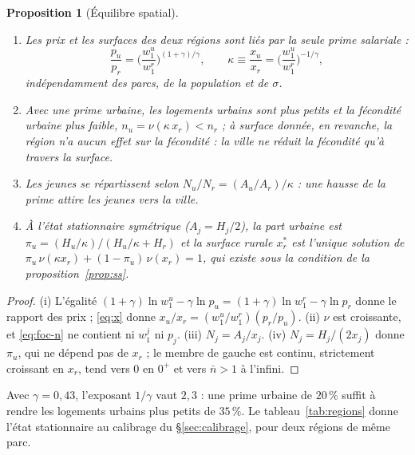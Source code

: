 \documentclass[11pt,a4paper]{article}
\theoremstyle{plain}
\newtheorem{proposition}{Proposition}
\theoremstyle{definition}
\begin{document}
\begin{proposition}[Équilibre spatial]\label{prop:regions}
\begin{enumerate}
\item[(i)] Les prix et les surfaces des deux régions sont liés par la seule prime salariale :
\[
\frac{p_u}{p_r} = \Big(\frac{w_1^u}{w_1^r}\Big)^{(1+\gamma)/\gamma} ,
\qquad
\kappa \equiv \frac{x_u}{x_r} = \Big(\frac{w_1^u}{w_1^r}\Big)^{-1/\gamma} ,
\]
indépendamment des parcs, de la population et de $\sigma$.
\item[(ii)] Avec une prime urbaine, les logements urbains sont plus petits et la fécondité urbaine plus faible, $n_u = \nu(\kappa\,x_r) < n_r$ ; à surface donnée, en revanche, la région n'a aucun effet sur la fécondité : la ville ne réduit la fécondité qu'à travers la surface.
\item[(iii)] Les jeunes se répartissent selon $N_u/N_r = (A_u/A_r)/\kappa$ : une hausse de la prime attire les jeunes vers la ville.
\item[(iv)] À l'état stationnaire symétrique ($A_j = H_j/2$), la part urbaine est $\pi_u = (H_u/\kappa)/(H_u/\kappa + H_r)$ et la surface rurale $x_r^*$ est l'unique solution de $\pi_u\,\nu(\kappa x_r) + (1-\pi_u)\,\nu(x_r) = 1$, qui existe sous la condition de la proposition~\ref{prop:ss}.
\end{enumerate}
\end{proposition}
\begin{proof}
(i) L'égalité $(1+\gamma)\ln w_1^u - \gamma\ln p_u = (1+\gamma)\ln w_1^r - \gamma\ln p_r$ donne le rapport des prix ; \eqref{eq:x} donne $x_u/x_r = (w_1^u/w_1^r)(p_r/p_u)$. (ii) $\nu$ est croissante, et \eqref{eq:foc-n} ne contient ni $w_1^j$ ni $p_j$. (iii) $N_j = A_j/x_j$. (iv) $N_j = H_j/(2x_j)$ donne $\pi_u$, qui ne dépend pas de $x_r$ ; le membre de gauche est continu, strictement croissant en $x_r$, tend vers $0$ en $0^+$ et vers $\bar n > 1$ à l'infini.
\end{proof}

Avec $\gamma = 0{,}43$, l'exposant $1/\gamma$ vaut $2{,}3$ : une prime urbaine de $20\,\%$ suffit à rendre les logements urbains plus petits de $35\,\%$. Le tableau~\ref{tab:regions} donne l'état stationnaire au calibrage du §\ref{sec:calibrage}, pour deux régions de même parc.
\end{document}
